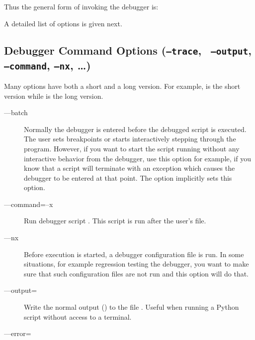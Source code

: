 Thus the general form of invoking the debugger is:

   

A detailed list of options is given next.

\subsection{Debugger Command Options ({\tt --trace}, {\tt
    --output}, {\tt --command}, {\tt --nx}, \ldots)\label{subsection-switches}}

Many options have both a short and a long version. For example,
 is the short version while  is the long
version.

\begin{description} 

\item[--{}--batch]

Normally the debugger is entered before the debugged script is
executed. The user sets breakpoints or starts interactively stepping
through the program. However, if you want to start the script running
without any interactive behavior from the debugger, use this option
for example, if you know that a script will terminate with an
exception which causes the debugger to be entered at that point. The
 option implicitly sets this option.

\item[--{}--command=\code{\Large{|}}--x ]\label{switch:command}

Run debugger script . This script is run after
the user's  file.

\item[--{}--nx\code{\Large{|}}]\label{switch:nx}

Before execution is started, a debugger configuration file
 is run. In some situations, for example regression
testing the debugger, you want to make sure that such configuration
files are not run and this option will do that.

\item[--{}--output=]

Write the normal output () to the file
. Useful when running a Python script without access to
a terminal.

\item[--{}--error=]


\end{description}
